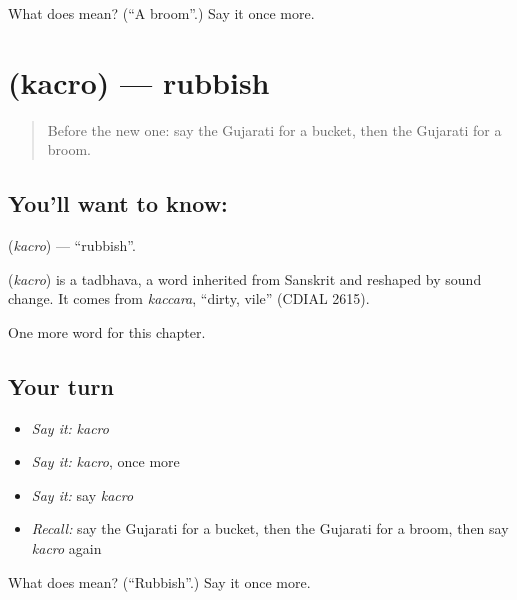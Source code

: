 \begin{tcolorbox}[breakable,colback=teal!4,colframe=teal!35!black,title={Before you move on}]
What does  mean? (\textquotedblleft{}A broom\textquotedblright{}.) Say it once more.
\end{tcolorbox}
\section[\texorpdfstring{\gu{કચરો} (kacro)}{કચરો (kacro)}]{ (kacro) — rubbish}

\label{lesson:GU-C109-kacro}



\begin{quote}
Before the new one: say the Gujarati for a bucket, then the Gujarati for a broom.
\end{quote}

\subsection*{You'll want to know: }
\textbf{} (\emph{kacro}) — \textquotedblleft{}rubbish\textquotedblright{}.

\begin{cousinweb}
\textbf{} (\emph{kacro}) is a tadbhava, a word inherited from Sanskrit and reshaped by sound change. It comes from \emph{kaccara}, \textquotedblleft{}dirty, vile\textquotedblright{} (CDIAL 2615).
\end{cousinweb}

\begin{grammarlens}[title={What you've built}]
One more word for this chapter.
\end{grammarlens}

\subsection*{Your turn}
\begin{itemize}
\raggedright
  \item \emph{Say it:} \emph{kacro}
  \item \emph{Say it:} \emph{kacro}, once more
  \item \emph{Say it:} say \emph{kacro}
  \item \emph{Recall:} say the Gujarati for a bucket, then the Gujarati for a broom, then say \emph{kacro} again
\end{itemize}

\begin{tcolorbox}[breakable,colback=teal!4,colframe=teal!35!black,title={Before you move on}]
What does  mean? (\textquotedblleft{}Rubbish\textquotedblright{}.) Say it once more.
\end{tcolorbox}
